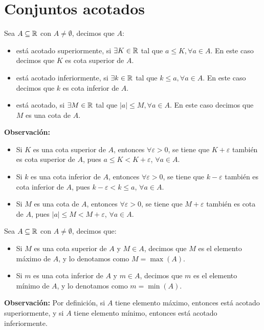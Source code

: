 \section*{Conjuntos acotados}

 Sea $A\subseteq \mathbb{R}$ con $A\neq \emptyset$, decimos que $A$:
\begin{itemize}
 \item está acotado superiormente, si $\exists K\in \mathbb{R}$ tal que $a \leq K, \forall a\in A$. En este caso decimos que $K$ es cota superior de $A$.

 \item está acotado inferiormente, si $\exists k\in \mathbb{R}$ tal que $k \leq a, \forall a\in A$. En este caso decimos que $k$ es cota inferior de $A$.

 \item está acotado, si $\exists M\in \mathbb{R}$ tal que $|a|\leq M,\forall a \in A$. En este caso decimos que $M$ es una cota de $A$.
\end{itemize}

\textbf{Observación:}
\begin{itemize}
  \item Si $K$ es una cota superior de $A$, entonces $\forall \varepsilon>0$, se tiene que $K+\varepsilon$ también es cota superior de $A$, pues $a \leq K<K+\varepsilon$, $\forall a\in A$. 
  \item Si $k$ es una cota inferior de $A$, entonces $\forall \varepsilon>0$, se tiene que $k - \varepsilon$ también es cota inferior de $A$, pues $k - \varepsilon < k \leq a$, $\forall a\in A$.
  \item Si $M$ es una cota de $A$, entonces $\forall \varepsilon>0$, se tiene que $M+\varepsilon$ también es cota de $A$, pues $|a|\leq M < M+\varepsilon$, $\forall a\in A$.
\end{itemize}

 Sea $A\subseteq \mathbb{R}$ con $A\neq \emptyset$, decimos que:
\begin{itemize}
  \item Si $M$ es una cota superior de $A$ y $M\in A$, decimos que $M$ es el elemento máximo de $A$, y lo denotamos como $M=\max(A)$.
  \item Si $m$ es una cota inferior de $A$ y $m\in A$, decimos que $m$ es el elemento mínimo de $A$, y lo denotamos como $m=\min(A)$.
\end{itemize}

\textbf{Observación:} Por definición, si $A$ tiene elemento máximo, entonces está acotado superiormente, y si $A$ tiene elemento mínimo, entonces está acotado inferiormente.

